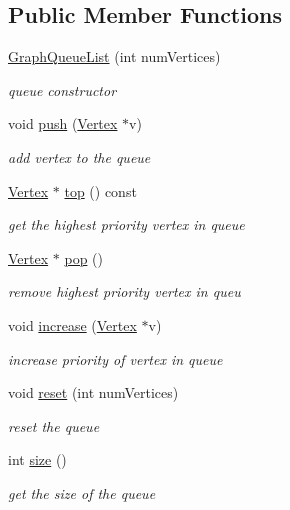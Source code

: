 \subsection*{Public Member Functions}
\begin{DoxyCompactItemize}
\item 
\hyperlink{class_graph_queue_list_a61c2e8ecb3fe52fca17dd84216f356a0}{Graph\+Queue\+List} (int num\+Vertices)
\begin{DoxyCompactList}\small\item\em queue constructor \end{DoxyCompactList}\item 
void \hyperlink{class_graph_queue_list_aeb2202e70dd2e556e7507327bd8824e9}{push} (\hyperlink{class_vertex}{Vertex} $\ast$v)
\begin{DoxyCompactList}\small\item\em add vertex to the queue \end{DoxyCompactList}\item 
\hyperlink{class_vertex}{Vertex} $\ast$ \hyperlink{class_graph_queue_list_a56493dd03e8378a67033eaba8c71d9ea}{top} () const 
\begin{DoxyCompactList}\small\item\em get the highest priority vertex in queue \end{DoxyCompactList}\item 
\hyperlink{class_vertex}{Vertex} $\ast$ \hyperlink{class_graph_queue_list_a17fc1e6582e763755c6b174a44ccd8ec}{pop} ()
\begin{DoxyCompactList}\small\item\em remove highest priority vertex in queu \end{DoxyCompactList}\item 
void \hyperlink{class_graph_queue_list_a27345d639d6719d91c552345d400f5f6}{increase} (\hyperlink{class_vertex}{Vertex} $\ast$v)
\begin{DoxyCompactList}\small\item\em increase priority of vertex in queue \end{DoxyCompactList}\item 
void \hyperlink{class_graph_queue_list_af404c9018114e84516ac28a3eeeee853}{reset} (int num\+Vertices)
\begin{DoxyCompactList}\small\item\em reset the queue \end{DoxyCompactList}\item 
int \hyperlink{class_graph_queue_list_afc858c2e41de40db8f7b217890cfc75c}{size} ()
\begin{DoxyCompactList}\small\item\em get the size of the queue \end{DoxyCompactList}\end{DoxyCompactItemize}


